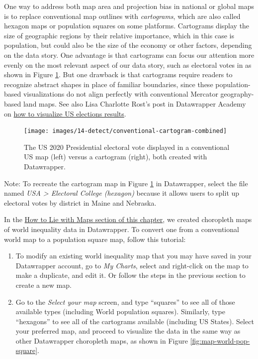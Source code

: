 \documentclass[
  english,
]{book}
\begin{document}
One way to address both map area and projection bias in national or global maps is to replace conventional map outlines with \emph{cartograms}, which are also called hexagon maps or population squares on some platforms. Cartograms display the size of geographic regions by their relative importance, which in this case is population, but could also be the size of the economy or other factors, depending on the data story. One advantage is that cartograms can focus our attention more evenly on the most relevant aspect of our data story, such as electoral votes in as shown in Figure \ref{fig:conventional-cartogram-combined}. But one drawback is that cartograms require readers to recognize abstract shapes in place of familiar boundaries, since these population-based visualizations do not align perfectly with conventional Mercator geography-based land maps. See also Lisa Charlotte Rost's post in Datawrapper Academy on \href{https://blog.datawrapper.de/how-to-visualize-the-us-election-2020-with-datawrapper/}{how to visualize US elections results}.



\begin{figure}
\texttt{[image: images/14-detect/conventional-cartogram-combined]} \caption{The US 2020 Presidential electoral vote displayed in a conventional US map (left) versus a cartogram (right), both created with Datawrapper.}\label{fig:conventional-cartogram-combined}
\end{figure}

Note: To recreate the cartogram map in Figure \ref{fig:conventional-cartogram-combined} in Datawrapper, select the file named \emph{USA \textgreater{} Electoral College (hexagon)} because it allows users to split up electoral votes by district in Maine and Nebraska.

In the \href{how-to-lie-with-maps.html}{How to Lie with Maps section of this chapter}, we created choropleth maps of world inequality data in Datawrapper. To convert one from a conventional world map to a population square map, follow this tutorial:

\begin{enumerate}
\def\labelenumi{\arabic{enumi}.}
\item
  To modify an existing world inequality map that you may have saved in your Datawrapper account, go to \emph{My Charts}, select and right-click on the map to make a duplicate, and edit it. Or follow the steps in the previous section to create a new map.
\item
  Go to the \emph{Select your map} screen, and type ``squares'' to see all of those available types (including World population squares). Similarly, type ``hexagons'' to see all of the cartograms available (including US States). Select your preferred map, and proceed to visualize the data in the same way as other Datawrapper choropleth maps, as shown in Figure \ref{fig:map-world-pop-square}.
\end{enumerate}
\end{document}
